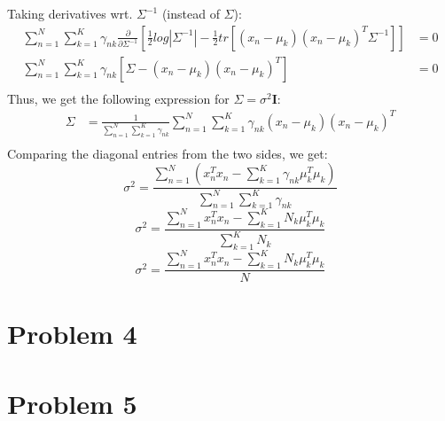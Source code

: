 \documentclass{article}
\begin{document}
Taking derivatives wrt. $\Sigma^{-1}$ (instead of $\Sigma$):
\begin{equation*}
\begin{aligned}
\sum_{n=1}^N\sum_{k=1}^K \gamma_{nk}\frac{\partial}{\partial \Sigma^{-1}}[ \frac{1}{2}log|\Sigma^{-1}| - \frac{1}{2}tr[(x_n- \mu_k)(x_n-\mu_k)^T\Sigma^{-1}]] &= 0\\
\sum_{n=1}^N\sum_{k=1}^K \gamma_{nk} [\Sigma - (x_n- \mu_k)(x_n-\mu_k)^T ] &=0 \\
\end{aligned}
\end{equation*}
Thus, we get the following expression for $\Sigma = \sigma^2\textbf{I}$:
\begin{equation*}
\begin{aligned}
\Sigma &= \frac{1}{\sum_{n=1}^N\sum_{k=1}^K \gamma_{nk}} \sum_{n=1}^N\sum_{k=1}^K \gamma_{nk}(x_n- \mu_k)(x_n-\mu_k)^T \\
\end{aligned}
\end{equation*}
Comparing the diagonal entries from the two sides, we get:
$$\sigma^2 = \frac{\sum_{n=1}^N (x_n^Tx_n - \sum_{k=1}^K \gamma_{nk}\mu_k^T\mu_k)}{\sum_{n=1}^N\sum_{k=1}^K \gamma_{nk}}$$
$$\sigma^2 = \frac{\sum_{n=1}^N x_n^Tx_n - \sum_{k=1}^KN_{k}\mu_k^T\mu_k}{\sum_{k=1}^K N_{k}}$$
$$\sigma^2 = \frac{\sum_{n=1}^N x_n^Tx_n - \sum_{k=1}^KN_{k}\mu_k^T\mu_k}{N}$$
\section{Problem 4}
\section{Problem 5}
\end{document}
